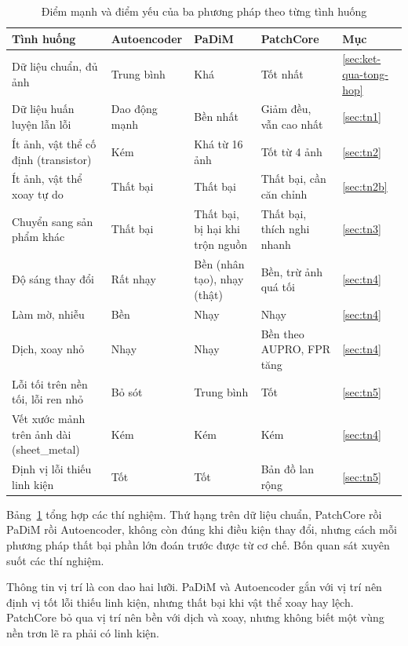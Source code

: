 \begin{table}[htbp]
  \centering
  \caption{Điểm mạnh và điểm yếu của ba phương pháp theo từng tình huống}
  \label{tab:thao-luan}
  \small
  \begin{tabular}{@{}>{\raggedright\arraybackslash}p{3.6cm}>{\raggedright\arraybackslash}p{2.4cm}>{\raggedright\arraybackslash}p{3.3cm}>{\raggedright\arraybackslash}p{3.2cm}l@{}}
    \toprule
    Tình huống & Autoencoder & PaDiM & PatchCore & Mục \\
    \midrule
    Dữ liệu chuẩn, đủ ảnh & Trung bình & Khá & Tốt nhất & \ref{sec:ket-qua-tong-hop} \\
    Dữ liệu huấn luyện lẫn lỗi & Dao động mạnh & Bền nhất & Giảm đều, vẫn cao nhất & \ref{sec:tn1} \\
    Ít ảnh, vật thể cố định (transistor) & Kém & Khá từ 16 ảnh & Tốt từ 4 ảnh & \ref{sec:tn2} \\
    Ít ảnh, vật thể xoay tự do & Thất bại & Thất bại & Thất bại, cần căn chỉnh & \ref{sec:tn2b} \\
    Chuyển sang sản phẩm khác & Thất bại & Thất bại, bị hại khi trộn nguồn & Thất bại, thích nghi nhanh & \ref{sec:tn3} \\
    Độ sáng thay đổi & Rất nhạy & Bền (nhân tạo), nhạy (thật) & Bền, trừ ảnh quá tối & \ref{sec:tn4} \\
    Làm mờ, nhiễu & Bền & Nhạy & Nhạy & \ref{sec:tn4} \\
    Dịch, xoay nhỏ & Nhạy & Nhạy & Bền theo AUPRO, FPR tăng & \ref{sec:tn4} \\
    Lỗi tối trên nền tối, lỗi ren nhỏ & Bỏ sót & Trung bình & Tốt & \ref{sec:tn5} \\
    Vết xước mảnh trên ảnh dài (sheet\_metal) & Kém & Kém & Kém & \ref{sec:tn4} \\
    Định vị lỗi thiếu linh kiện & Tốt & Tốt & Bản đồ lan rộng & \ref{sec:tn5} \\
    \bottomrule
  \end{tabular}
\end{table}

Bảng~\ref{tab:thao-luan} tổng hợp các thí nghiệm. Thứ hạng trên dữ liệu chuẩn, PatchCore rồi PaDiM rồi Autoencoder,
không còn đúng khi điều kiện thay đổi, nhưng cách mỗi phương pháp thất bại phần lớn đoán trước được từ cơ chế. Bốn
quan sát xuyên suốt các thí nghiệm.

Thông tin vị trí là con dao hai lưỡi. PaDiM và Autoencoder gắn với vị trí nên định vị tốt lỗi thiếu linh kiện, nhưng
thất bại khi vật thể xoay hay lệch. PatchCore bỏ qua vị trí nên bền với dịch và xoay, nhưng không biết một vùng nền
trơn lẽ ra phải có linh kiện.

